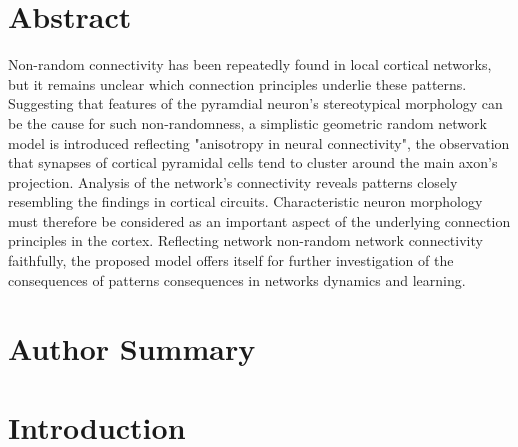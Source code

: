 \section*{Abstract}
Non-random connectivity has been repeatedly found in local cortical
networks, but it remains unclear which connection principles underlie
these patterns. Suggesting that features of the pyramdial neuron's
stereotypical morphology can be the cause for such non-randomness, a
simplistic geometric random network model is introduced reflecting
"anisotropy in neural connectivity", the observation that synapses of
cortical pyramidal cells tend to cluster around the main axon's
projection. Analysis of the network's connectivity reveals patterns
closely resembling the findings in cortical circuits. Characteristic
neuron morphology must therefore be considered as an important aspect
of the underlying connection principles in the cortex. Reflecting
network non-random network connectivity faithfully, the proposed model
offers itself for further investigation of the consequences of
patterns consequences in networks dynamics and learning.



\section*{Author Summary}


\section*{Introduction}



